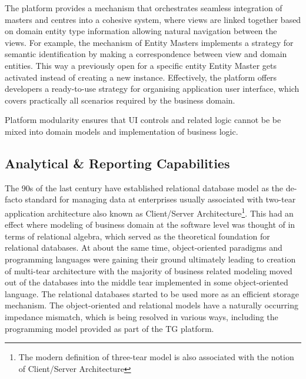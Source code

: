   The platform provides a mechanism that orchestrates seamless integration of masters and centres into a cohesive system, where views are linked together based on domain entity type information allowing natural navigation between the views.
  For example, the mechanism of Entity Masters implements a strategy for semantic identification by making a correspondence between view and domain entities.
  This way a previously open for a specific entity Entity Master gets activated instead of creating a new instance.
  Effectively, the platform offers developers a ready-to-use strategy for organising application user interface, which covers practically all scenarios required by the business domain.

  Platform modularity ensures that UI controls and related logic cannot be be mixed into domain models and implementation of business logic.
  
  \subsection{Analytical \& Reporting Capabilities}
  The 90s of the last century have established relational database model as the de-facto standard for managing data at enterprises usually associated with two-tear application architecture also known as Client/Server Architecture\footnote{The modern definition of three-tear model is also associated with the notion of Client/Server Architecture}.
  This had an effect where modeling of business domain at the software level was thought of in terms of relational algebra, which served as the theoretical foundation for relational databases.
  At about the same time, object-oriented paradigms and programming languages were gaining their ground ultimately leading to creation of multi-tear architecture with the majority of business related modeling moved out of the databases into the middle tear implemented in some object-oriented language.
  The relational databases started to be used more as an efficient storage mechanism.
  The object-oriented and relational models have a naturally occurring impedance mismatch, which is being resolved in various ways, including the programming model provided as part of the TG platform.
  
